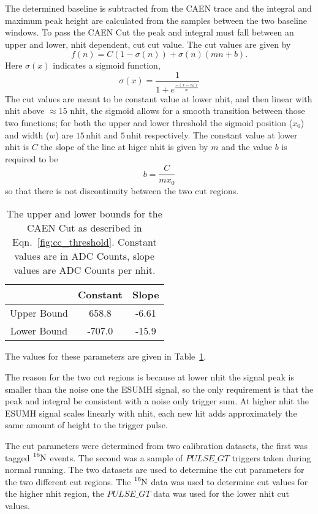 The determined baseline is subtracted from the CAEN trace and the integral and maximum
peak height are calculated from the samples between the two baseline windows.
To pass the CAEN Cut the peak and integral must fall between an upper and lower, nhit dependent,
cut cut value.
The cut values are given by
\begin{equation}
    f(n) = C\left(1-\sigma(n)\right) + \sigma(n)\left(mn+b\right)\text{.}
    \label{eqn:cc_threshold}
\end{equation}
Here $\sigma(x)$ indicates a sigmoid function,
\begin{equation}
    \sigma(x) = \frac{1}{1+e^{\frac{-(x-x_{0})}{w}}}
\end{equation}
The cut values are meant to be constant value at lower nhit, and then
linear with nhit above $\approx15$ nhit, the sigmoid allows for a smooth
transition between those two functions; for both the upper and lower threshold
the sigmoid position ($x_{0}$) and width ($w$) are $15$\,nhit and $5$\,nhit respectively.
The constant value at lower nhit is $C$ the slope of the line at higer nhit
is given by $m$ and the value $b$ is required to be
\begin{equation}
    b = \frac{C}{mx_{0}}
\end{equation}
so that there is not discontinuity between the two cut regions.
\begin{table}
    \centering
  \begin{tabular}{c | c c}
      & Constant & Slope  \\
      \hline
      Upper Bound & 658.8 & -6.61\\
      Lower Bound & -707.0 & -15.9\\
    \end{tabular}
    \caption[CAEN Cut Values]{The upper and lower bounds for the CAEN Cut as
    described in Eqn.~\eqref{fig:cc_threshold}.
    Constant values are in ADC Counts, slope values are ADC Counts per nhit.}
\label{tbl:caen_cut}
\end{table}
The values for these parameters are given in Table~\ref{tbl:caen_cut}.

The reason for the two cut regions is because at lower nhit the signal
peak is smaller than the noise one the ESUMH signal, so the only requirement
is that the peak and integral be consistent with a noise only trigger sum.
At higher nhit the ESUMH signal scales linearly with nhit, each new hit
adds approximately the same amount of height to the trigger pulse.

The cut parameters were determined from two calibration datasets, the first was
tagged $\ce{^{16}N}$
events. The second was a sample of $PULSE\_GT$ triggers taken during normal
running.
The two datasets are used to determine the cut parameters for the two
different cut regions.
The $\ce{^{16}N}$ data was used to determine cut values for the higher nhit
region, the $PULSE\_GT$ data was used for the lower nhit cut values.

